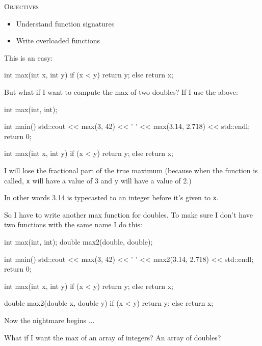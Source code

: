 \newpage{}

\textsc{Objectives}
\begin{itemize}
\item Understand function signatures
\item Write overloaded functions
\end{itemize}


\newpage{}

This is an easy:

\begin{consolethree}[escapeinside=||]
int max(int x, int y)
{
    if (x < y) return y;
    else return x;
}
\end{consolethree}

But what if I want to compute the max of two doubles? If I use the
above:

\begin{consolethree}[escapeinside=||]
int max(int, int);

int main()
{
    std::cout << max(3, 42) << ' '
              << max(3.14, 2.718) << std::endl;
    return 0;
}

int max(int x, int y)
{
    if (x < y) return y;
    else return x;
}
\end{consolethree}

I will lose the fractional part of the true maximum (because when the function is called, \texttt{x} will have a value of 3 and y will have a value of 2.)

In other words 3.14 is typecasted to an integer before it's given to \texttt{x}.

So I have to write another max function for doubles. To make sure I don't have two functions with the same name I do this:

\begin{consolethree}[escapeinside=||]
int max(int, int);
double max2(double, double);

int main()
{
    std::cout << max(3, 42) << ' '
              << max2(3.14, 2.718) << std::endl;
    return 0;
}

int max(int x, int y)
{
    if (x < y) return y;
    else return x;
}

double max2(double x, double y)
{
    if (x < y) return y;
    else return x;
}
\end{consolethree}

Now the nightmare begins ...

What if I want the max of an array of integers? An array of doubles?

